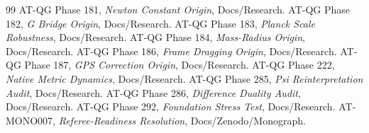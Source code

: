 \begin{thebibliography}{99}
 AT-QG Phase 181, \emph{Newton Constant Origin}, Docs/Research.
 AT-QG Phase 182, \emph{G Bridge Origin}, Docs/Research.
 AT-QG Phase 183, \emph{Planck Scale Robustness}, Docs/Research.
 AT-QG Phase 184, \emph{Mass-Radius Origin}, Docs/Research.
 AT-QG Phase 186, \emph{Frame Dragging Origin}, Docs/Research.
 AT-QG Phase 187, \emph{GPS Correction Origin}, Docs/Research.
 AT-QG Phase 222, \emph{Native Metric Dynamics}, Docs/Research.
 AT-QG Phase 285, \emph{Psi Reinterpretation Audit}, Docs/Research.
 AT-QG Phase 286, \emph{Difference Duality Audit}, Docs/Research.
 AT-QG Phase 292, \emph{Foundation Stress Test}, Docs/Research.
 AT-MONO007, \emph{Referee-Readiness Resolution}, Docs/Zenodo/Monograph.
\end{thebibliography}
